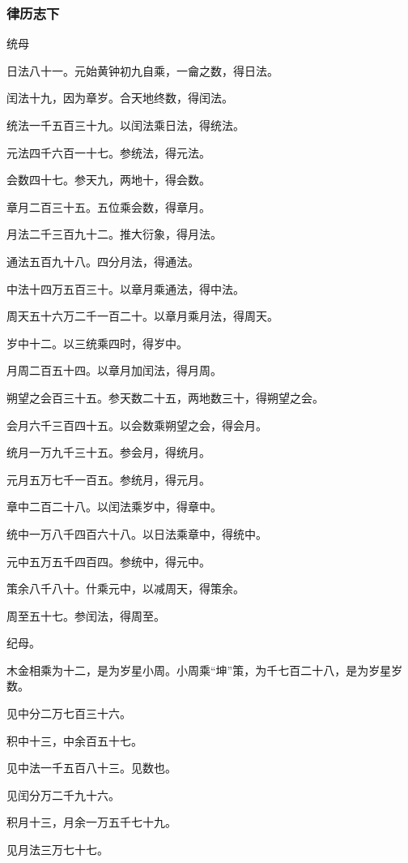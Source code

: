 \documentclass[]{article}
\begin{document}
\hypertarget{header-n1235}{%
\subsubsection{律历志下}\label{header-n1235}}

统母

日法八十一。元始黄钟初九自乘，一龠之数，得日法。

闰法十九，因为章岁。合天地终数，得闰法。

统法一千五百三十九。以闰法乘日法，得统法。

元法四千六百一十七。参统法，得元法。

会数四十七。参天九，两地十，得会数。

章月二百三十五。五位乘会数，得章月。

月法二千三百九十二。推大衍象，得月法。

通法五百九十八。四分月法，得通法。

中法十四万五百三十。以章月乘通法，得中法。

周天五十六万二千一百二十。以章月乘月法，得周天。

岁中十二。以三统乘四时，得岁中。

月周二百五十四。以章月加闰法，得月周。

朔望之会百三十五。参天数二十五，两地数三十，得朔望之会。

会月六千三百四十五。以会数乘朔望之会，得会月。

统月一万九千三十五。参会月，得统月。

元月五万七千一百五。参统月，得元月。

章中二百二十八。以闰法乘岁中，得章中。

统中一万八千四百六十八。以日法乘章中，得统中。

元中五万五千四百四。参统中，得元中。

策余八千八十。什乘元中，以减周天，得策余。

周至五十七。参闰法，得周至。

纪母。

木金相乘为十二，是为岁星小周。小周乘``坤''策，为千七百二十八，是为岁星岁数。

见中分二万七百三十六。

积中十三，中余百五十七。

见中法一千五百八十三。见数也。

见闰分万二千九十六。

积月十三，月余一万五千七十九。

见月法三万七十七。
\end{document}
